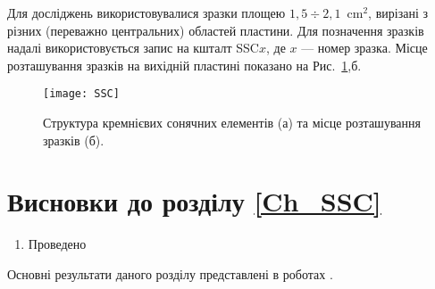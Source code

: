 \documentclass[a4paper,14pt,oneside,openany]{memoir}
\begin{document}
Для досліджень використовувалися зразки площею $1,5\div2,1$~cm$^{2}$, вирізані з різних (переважно центральних) областей пластини.
Для позначення зразків надалі використовується запис на кшталт SSC$x$, де $x$ --- номер зразка.
Місце розташування зразків на вихідній пластині показано на Рис.~\ref{figSSC},б.


\begin{figure}
\center
\texttt{[image: SSC]}%
\caption{\label{figSSC}
Структура кремнієвих сонячних елементів (а) та місце розташування зразків (б).
}
\end{figure}

\section*{Висновки до розділу \ref{Ch_SSC}}
  \begin{enumerate}
     \item Проведено
  \end{enumerate}	
  
Основні результати даного розділу представлені в роботах \cite{Olikh:Rev,6CPFCS}.

  













\end{document}
